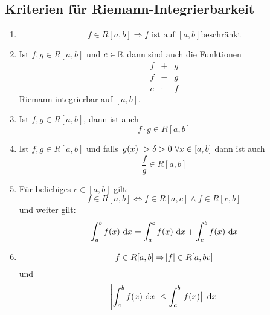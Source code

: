 \subsection{Kriterien für Riemann-Integrierbarkeit}
\begin{enumerate}[label= (\alph*)]
    \item
        \begin{equation*}
            f \in R[a, b] \Rightarrow f \text{ ist auf } [a,b] \text{beschränkt}
        \end{equation*}
    \item Ist $f, g \in R [a, b]$ und $c \in \mathbb{R}$ dann sind auch die Funktionen
        \begin{eqnarray*}
            f&+&g\\
            f&-&g\\
            c &\cdot& f
        \end{eqnarray*}
        Riemann integrierbar auf $[a, b]$.
    \item Ist $f, g \in R[a, b]$, dann ist auch
        \begin{equation*}
            f \cdot g \in R[a, b]
        \end{equation*}
    \item Ist $f, g \in R[a, b]$ und falls
        $\abs{g(x)} > \delta > 0\ \forall x \in [a, b]$ dann ist auch
        \begin{equation*}
            \frac{f}{g} \in R[a, b]
        \end{equation*}
    \item Für beliebiges $c \in [a, b]$  gilt:
        \begin{equation*}
            f \in R[a, b] \Leftrightarrow f \in R[a, c] \land f \in R[c, b]
        \end{equation*}
        und weiter gilt:
        \begin{equation*}
            \int_a^b f(x) \text{ d}x = \int_a^c f(x) \text{ d}x + \int_c^b f(x) \text{ d}x
        \end{equation*}
    \item
        \begin{equation*}
        f \in R[a, b] \Rightarrow \abs{f} \in R[a, bv]
        \end{equation*}
        und
        \begin{equation*}
            \abs{\int_a^b f(x)\text{ d}x} \leq \int_a^b \abs{f(x)} \text{ d}x
        \end{equation*}
\end{enumerate}

